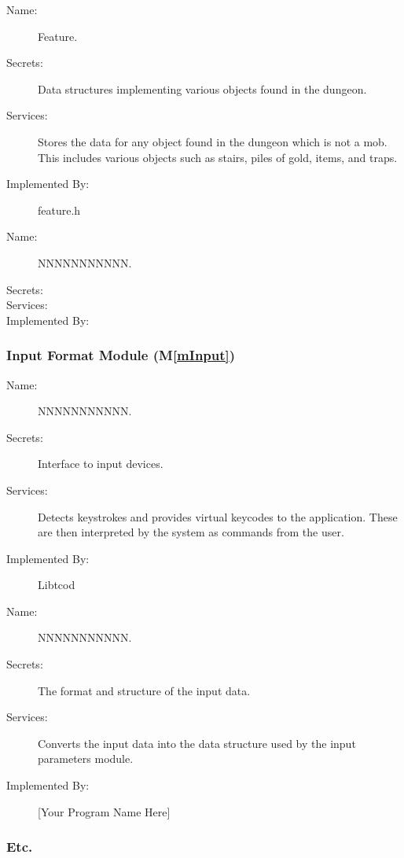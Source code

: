 \documentclass[12pt, titlepage]{article}
\newcommand{\mref}[1]{M\ref{#1}}
\begin{document}
		\bigskip\begin{description}
			\item[Name:]Feature.
			\item[Secrets:]Data structures implementing various objects found in the dungeon.
			\item[Services:]Stores the data for any object found in the dungeon which is not a mob. This includes various objects such as stairs, piles of gold, items, and traps.
			\item[Implemented By:]feature.h
		\end{description}

		\bigskip\begin{description}
			\item[Name:]NNNNNNNNNNN.
			\item[Secrets:]
			\item[Services:]
			\item[Implemented By:]
		\end{description}

	\subsubsection{Input Format Module (\mref{mInput})}

		\bigskip\begin{description}
			\item[Name:]NNNNNNNNNNN.
			\item[Secrets:]Interface to input devices.
			\item[Services:]Detects keystrokes and provides virtual keycodes to the application. These are then interpreted by the system as commands from the user.
			\item[Implemented By:] Libtcod
		\end{description}

		\bigskip\begin{description}
			\item[Name:]NNNNNNNNNNN.
			\item[Secrets:]The format and structure of the input data.
			\item[Services:]Converts the input data into the data structure used by the input parameters module.
			\item[Implemented By:] [Your Program Name Here]
		\end{description}

	  \subsubsection{Etc.}
\end{document}
